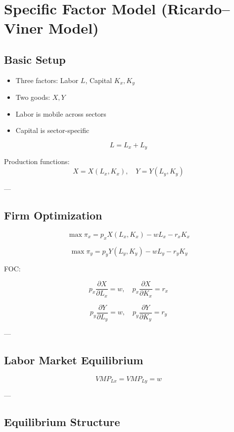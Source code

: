 \chapter{Specific Factor Model (Ricardo--Viner Model)}

\section{Basic Setup}

\begin{itemize}
    \item Three factors: Labor $L$, Capital $K_x, K_y$
    \item Two goods: $X, Y$
\end{itemize}

\begin{itemize}
    \item Labor is mobile across sectors
    \item Capital is sector-specific
\end{itemize}

\[
L = L_x + L_y
\]

Production functions:
\[
X = X(L_x, K_x), \quad Y = Y(L_y, K_y)
\]

---

\section{Firm Optimization}

\[
\max \pi_x = p_x X(L_x, K_x) - w L_x - r_x K_x
\]

\[
\max \pi_y = p_y Y(L_y, K_y) - w L_y - r_y K_y
\]

FOC:

\[
p_x \frac{\partial X}{\partial L_x} = w, \quad
p_x \frac{\partial X}{\partial K_x} = r_x
\]

\[
p_y \frac{\partial Y}{\partial L_y} = w, \quad
p_y \frac{\partial Y}{\partial K_y} = r_y
\]

---

\section{Labor Market Equilibrium}

\[
VMP_{Lx} = VMP_{Ly} = w
\]

---

\section{Equilibrium Structure}

